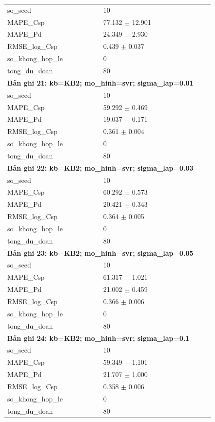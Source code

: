 \begin{longtable}{p{0.43\linewidth}p{0.50\linewidth}}
so\_\allowbreak seed & 10 \\
MAPE\_\allowbreak Csp & 77.132 $\pm$ 12.901 \\
MAPE\_\allowbreak Pd & 24.349 $\pm$ 2.930 \\
RMSE\_\allowbreak log\_\allowbreak Csp & 0.439 $\pm$ 0.037 \\
so\_\allowbreak khong\_\allowbreak hop\_\allowbreak le & 0 \\
tong\_\allowbreak du\_\allowbreak doan & 80 \\
\midrule
\multicolumn{2}{p{0.95\linewidth}}{\textbf{Bản ghi 21: kb=KB2; mo\_hinh=svr; sigma\_lap=0.01}} \\
so\_\allowbreak seed & 10 \\
MAPE\_\allowbreak Csp & 59.292 $\pm$ 0.469 \\
MAPE\_\allowbreak Pd & 19.037 $\pm$ 0.171 \\
RMSE\_\allowbreak log\_\allowbreak Csp & 0.361 $\pm$ 0.004 \\
so\_\allowbreak khong\_\allowbreak hop\_\allowbreak le & 0 \\
tong\_\allowbreak du\_\allowbreak doan & 80 \\
\midrule
\multicolumn{2}{p{0.95\linewidth}}{\textbf{Bản ghi 22: kb=KB2; mo\_hinh=svr; sigma\_lap=0.03}} \\
so\_\allowbreak seed & 10 \\
MAPE\_\allowbreak Csp & 60.292 $\pm$ 0.573 \\
MAPE\_\allowbreak Pd & 20.421 $\pm$ 0.343 \\
RMSE\_\allowbreak log\_\allowbreak Csp & 0.364 $\pm$ 0.005 \\
so\_\allowbreak khong\_\allowbreak hop\_\allowbreak le & 0 \\
tong\_\allowbreak du\_\allowbreak doan & 80 \\
\midrule
\multicolumn{2}{p{0.95\linewidth}}{\textbf{Bản ghi 23: kb=KB2; mo\_hinh=svr; sigma\_lap=0.05}} \\
so\_\allowbreak seed & 10 \\
MAPE\_\allowbreak Csp & 61.317 $\pm$ 1.021 \\
MAPE\_\allowbreak Pd & 21.002 $\pm$ 0.459 \\
RMSE\_\allowbreak log\_\allowbreak Csp & 0.366 $\pm$ 0.006 \\
so\_\allowbreak khong\_\allowbreak hop\_\allowbreak le & 0 \\
tong\_\allowbreak du\_\allowbreak doan & 80 \\
\midrule
\multicolumn{2}{p{0.95\linewidth}}{\textbf{Bản ghi 24: kb=KB2; mo\_hinh=svr; sigma\_lap=0.1}} \\
so\_\allowbreak seed & 10 \\
MAPE\_\allowbreak Csp & 59.349 $\pm$ 1.101 \\
MAPE\_\allowbreak Pd & 21.707 $\pm$ 1.000 \\
RMSE\_\allowbreak log\_\allowbreak Csp & 0.358 $\pm$ 0.006 \\
so\_\allowbreak khong\_\allowbreak hop\_\allowbreak le & 0 \\
tong\_\allowbreak du\_\allowbreak doan & 80 \\
\midrule
\bottomrule
\end{longtable}
